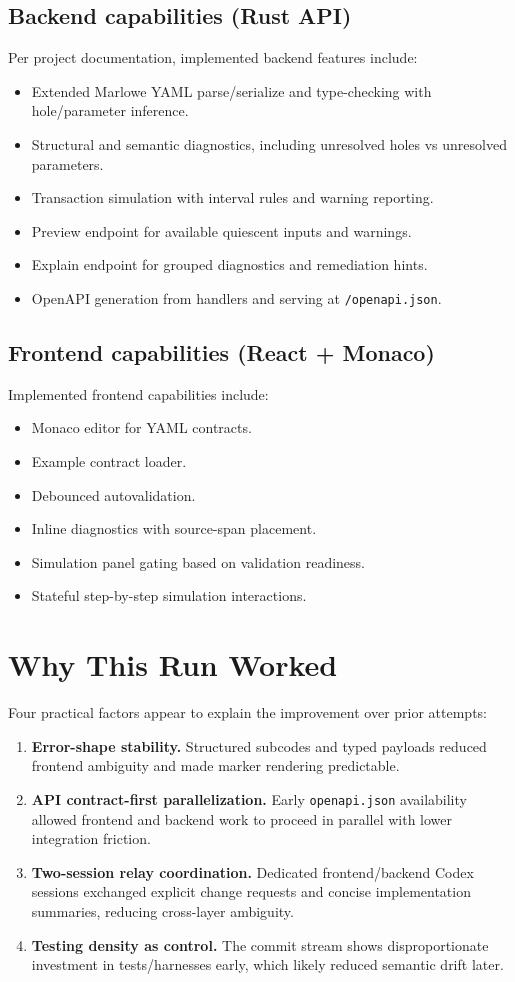 \documentclass[11pt]{article}
\begin{document}
\subsection{Backend capabilities (Rust API)}
Per project documentation, implemented backend features include:
\begin{itemize}
  \item Extended Marlowe YAML parse/serialize and type-checking with hole/parameter inference.
  \item Structural and semantic diagnostics, including unresolved holes vs unresolved parameters.
  \item Transaction simulation with interval rules and warning reporting.
  \item Preview endpoint for available quiescent inputs and warnings.
  \item Explain endpoint for grouped diagnostics and remediation hints.
  \item OpenAPI generation from handlers and serving at \texttt{/openapi.json}.
\end{itemize}

\subsection{Frontend capabilities (React + Monaco)}
Implemented frontend capabilities include:
\begin{itemize}
  \item Monaco editor for YAML contracts.
  \item Example contract loader.
  \item Debounced autovalidation.
  \item Inline diagnostics with source-span placement.
  \item Simulation panel gating based on validation readiness.
  \item Stateful step-by-step simulation interactions.
\end{itemize}

\section{Why This Run Worked}
Four practical factors appear to explain the improvement over prior attempts:
\begin{enumerate}
  \item \textbf{Error-shape stability.} Structured subcodes and typed payloads reduced frontend ambiguity and made marker rendering predictable.
  \item \textbf{API contract-first parallelization.} Early \texttt{openapi.json} availability allowed frontend and backend work to proceed in parallel with lower integration friction.
  \item \textbf{Two-session relay coordination.} Dedicated frontend/backend Codex sessions exchanged explicit change requests and concise implementation summaries, reducing cross-layer ambiguity.
  \item \textbf{Testing density as control.} The commit stream shows disproportionate investment in tests/harnesses early, which likely reduced semantic drift later.
\end{enumerate}
\end{document}
